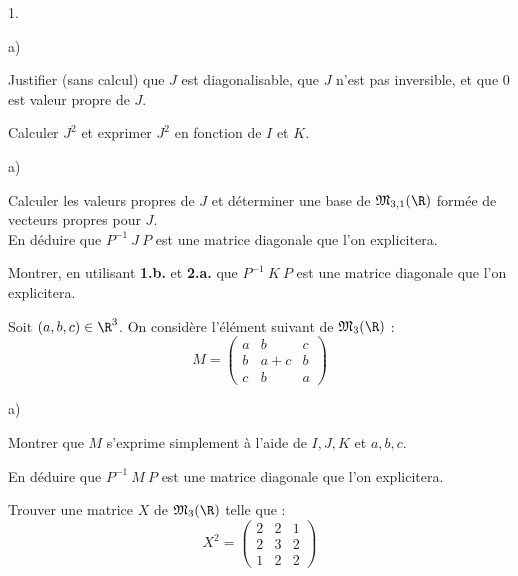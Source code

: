 \documentclass[11pt]{article}%
\begin{document}
\begin{noliste}{1.}
 \setlength{\itemsep}{4mm}
\item 
\begin{noliste}{a)}
 \setlength{\itemsep}{2mm}
\item Justifier (sans calcul) que $J$ est diagonalisable, que $J$ n'est
pas
inversible, et que $0$ est valeur propre de $J$.

\item Calculer $J^{2}$ et exprimer $J^{2}$ en fonction de $I$ et $K$.
\end{noliste}

\begin{noliste}{a)}
 \setlength{\itemsep}{2mm}
\item Calculer les valeurs propres de $J$ et déterminer une base de
$\mathfrak{M}_{3,1}(\R)$ formée de vecteurs propres pour $J$.\\
En déduire que $P^{-1}\ J\ P$ est une matrice diagonale que l'on
explicitera.

\item Montrer, en utilisant \textbf{1.b.} et \textbf{2.a.} que $P^{-1}\
K\ P$
est une matrice diagonale que l'on explicitera.
\end{noliste}

\item Soit $(a,b,c)\in \R^{3}$. On considère l'élément
suivant de $\mathfrak{M}_{3}(\R)$ : 
\[
M = \left( 
\begin{array}{ccc}
a & b & c \\
b & a + c & b \\
c & b & a
\end{array}
\right)
\]

\begin{noliste}{a)}
 \setlength{\itemsep}{2mm}
\item Montrer que $M$ s'exprime simplement à l'aide de $I,J,K$ et
$a,b,c$.

\item En déduire que $P^{-1}\ M\ P$ est une matrice diagonale que l'on
explicitera.
\end{noliste}

\item Trouver une matrice $X$ de $\mathfrak{M}_{3}(\R)$ telle que : 
\[
X^{2} = \left( 
\begin{array}{ccc}
2 & 2 & 1 \\
2 & 3 & 2 \\
1 & 2 & 2
\end{array}
\right)
\]
\end{noliste}
\end{document}
